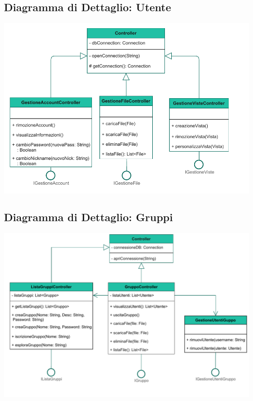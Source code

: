\subsection*{Diagramma di Dettaglio: Utente}
{}
\vspace{0.5cm}
\begin{adjustwidth}{-1cm}{0cm}
\includegraphics[scale=1]{progettazione/Progettazione-Dettaglio Utente.drawio.pdf}
\end{adjustwidth}
\vspace{0.5cm}

\subsection*{Diagramma di Dettaglio: Gruppi}
\vspace{0.5cm}
{}
\begin{adjustwidth}{-2cm}{0cm}
\includegraphics[scale=0.9]{progettazione/Progettazione-DettaglioGruppi.drawio.pdf}
\end{adjustwidth}
\vspace{0.5cm}



